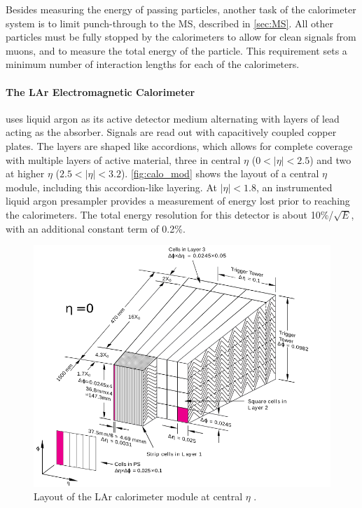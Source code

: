 Besides measuring the energy of passing particles, another task of the calorimeter system is to limit punch-through to the \ac{MS}, described in \autoref{sec:MS}. All other particles must be fully stopped by the calorimeters to allow for clean signals from muons, and to measure the total energy of the particle. This requirement sets a minimum number of interaction lengths for each of the calorimeters. 

\paragraph{The LAr Electromagnetic Calorimeter} uses liquid argon as its active detector medium alternating with layers of lead acting as the absorber. Signals are read out with capacitively coupled copper plates. The layers are shaped like accordions, which allows for complete coverage with multiple layers of active material, three in central $\eta$ ($0<|\eta|<2.5$) and two at higher $\eta$ ($2.5 < |\eta| < 3.2$). \autoref{fig:calo_mod} shows the layout of a central $\eta$ module, including this accordion-like layering. At $|\eta| < 1.8$, an instrumented liquid argon presampler provides a measurement of energy lost prior to reaching the calorimeters. The total energy resolution for this detector is about 10\%/$\sqrt{E}$, with an additional constant term of 0.2\%. 

\begin{centering}
\begin{figure}[!htb]
\myfloatalign
\includegraphics[width=.90\linewidth]{figures/atlas/LARG3-TDR-barrelM_samplings_presamp_new.png}
\caption{Layout of the LAr calorimeter module at central $\eta$ \cite{PERF-2007-01}.}
\label{fig:calo_mod}
\end{figure}
\end{centering}

